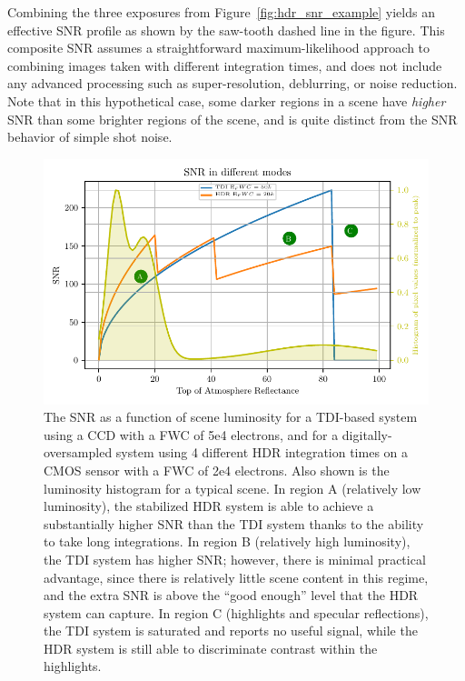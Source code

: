 \documentclass[]{spieman}  %
\begin{document}
Combining the three exposures from Figure~\ref{fig:hdr_snr_example} yields an effective SNR profile as shown by the saw-tooth dashed line in the figure. This composite SNR assumes a straightforward maximum-likelihood approach to combining images taken with different integration times, and does not include any advanced processing such as super-resolution, deblurring, or noise reduction. Note that in this hypothetical case, some darker regions in a scene have \emph{higher} SNR than some brighter regions of the scene, and is quite distinct from the SNR behavior of simple shot noise.

\begin{figure}
  \centering
  \includegraphics[]{figures/snr_vs_L.pdf}
  \caption{The SNR as a function of scene luminosity for a TDI-based system using a CCD with a FWC of 5e4 electrons, and for a digitally-oversampled system using 4 different HDR integration times on a CMOS sensor with a FWC of 2e4 electrons. Also shown is the luminosity histogram for a typical scene. In region A (relatively low luminosity), the stabilized HDR system is able to achieve a substantially higher SNR than the TDI system thanks to the ability to take long integrations. In region B (relatively high luminosity), the TDI system has higher SNR; however, there is minimal practical advantage, since there is relatively little scene content in this regime, and the extra SNR is above the “good enough” level that the HDR system can capture. In region C (highlights and specular reflections), the TDI system is saturated and reports no useful signal, while the HDR system is still able to discriminate contrast within the highlights. \label{fig:snr_vs_L}}
\end{figure}
\end{document}
